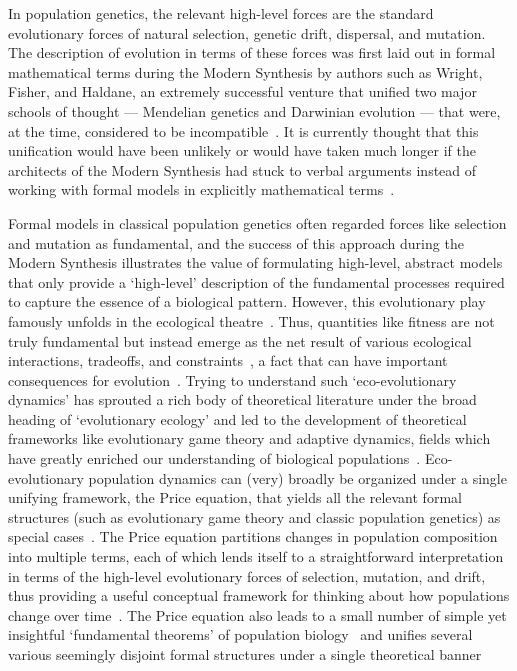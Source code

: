 In population genetics, the relevant high-level forces are the standard evolutionary forces of natural selection, genetic drift, dispersal, and mutation. The description of evolution in terms of these forces was first laid out in formal mathematical terms during the Modern Synthesis by authors such as Wright, Fisher, and Haldane, an extremely successful venture that unified two major schools of thought --- Mendelian genetics and Darwinian evolution --- that were, at the time, considered to be incompatible~\citep{provine_origins_2001}. It is currently thought that this unification would have been unlikely or would have taken much longer if the architects of the Modern Synthesis had stuck to verbal arguments instead of working with formal models in explicitly mathematical terms~\citep{walsh_darwins_2014}. 

Formal models in classical population genetics often regarded forces like selection and mutation as fundamental, and the success of this approach during the Modern Synthesis illustrates the value of formulating high-level, abstract models that only provide a `high-level' description of the fundamental processes required to capture the essence of a biological pattern. However, this evolutionary play famously unfolds in the ecological theatre~\citep{hutchinson_ecological_1965}. Thus, quantities like fitness are not truly fundamental but instead emerge as the net result of various ecological interactions, tradeoffs, and constraints~\citep{metz_how_1992}, a fact that can have important consequences for evolution~\citep{coulson_putting_2006, kokko_can_2017}. Trying to understand such `eco-evolutionary dynamics' has sprouted a rich body of theoretical literature under the broad heading of `evolutionary ecology' and led to the development of theoretical frameworks like evolutionary game theory and adaptive dynamics, fields which have greatly enriched our understanding of biological populations~\citep{brown_why_2016}. Eco-evolutionary population dynamics can (very) broadly be organized under a single unifying framework, the Price equation, that yields all the relevant formal structures (such as evolutionary game theory and classic population genetics) as special cases~\citep{page_unifying_2002, queller_fundamental_2017, lion_theoretical_2018}. The Price equation partitions changes in population composition into multiple terms, each of which lends itself to a straightforward interpretation in terms of the high-level evolutionary forces of selection, mutation, and drift, thus providing a useful conceptual framework for thinking about how populations change over time~\citep{frank_natural_2012}. The Price equation also leads to a small number of simple yet insightful `fundamental theorems' of population biology~\citep{queller_fundamental_2017, lion_theoretical_2018, lehtonen_price_2018} and unifies several various seemingly disjoint formal structures under a single theoretical banner~\citep{ lehtonen_price_2020, luque_mirror_2021}

